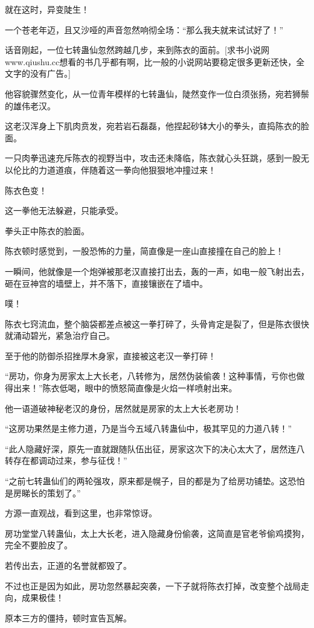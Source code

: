\begin{this_body}
就在这时，异变陡生！

一个苍老年迈，且又沙哑的声音忽然响彻全场：“那么我夫就来试试好了！”

话音刚起，一位七转蛊仙忽然跨越几步，来到陈衣的面前。[求书小说网www.qiushu.cc想看的书几乎都有啊，比一般的小说网站要稳定很多更新还快，全文字的没有广告。]

他容貌骤然变化，从一位青年模样的七转蛊仙，陡然变作一位白须张扬，宛若狮鬃的雄伟老汉。

这老汉浑身上下肌肉贲发，宛若岩石磊磊，他捏起砂钵大小的拳头，直捣陈衣的脸面。

一只肉拳迅速充斥陈衣的视野当中，攻击还未降临，陈衣就心头狂跳，感到一股无以伦比的力道道痕，伴随着这一拳向他狠狠地冲撞过来！

陈衣色变！

这一拳他无法躲避，只能承受。

拳头正中陈衣的脸面。

陈衣顿时感觉到，一股恐怖的力量，简直像是一座山直接撞在自己的脸上！

一瞬间，他就像是一个炮弹被那老汉直接打出去，轰的一声，如电一般飞射出去，砸在豆神宫的墙壁上，并不落下，直接镶嵌在了墙中。

噗！

陈衣七窍流血，整个脑袋都差点被这一拳打碎了，头骨肯定是裂了，但是陈衣很快就涌动碧光，紧急治疗自己。

至于他的防御杀招挫厚木身家，直接被这老汉一拳打碎！

“房功，你身为房家太上大长老，八转修为，居然伪装偷袭！这种事情，亏你也做得出来！”陈衣低喝，眼中的愤怒简直像是火焰一样喷射出来。

他一语道破神秘老汉的身份，居然就是房家的太上大长老房功！

“这房功果然是主修力道，乃是当今五域八转蛊仙中，极其罕见的力道八转！”

“此人隐藏好深，原先一直就跟随队伍出征，房家这次下的决心太大了，居然连八转存在都调动过来，参与征伐！”

“之前七转蛊仙们的两轮强攻，原来都是幌子，目的都是为了给房功铺垫。这恐怕是房睇长的策划了。”

方源一直观战，看到这里，也非常惊讶。

房功堂堂八转蛊仙，太上大长老，进入隐藏身份偷袭，这简直是官老爷偷鸡摸狗，完全不要脸皮了。

若传出去，正道的名誉就都毁了。

不过也正是因为如此，房功忽然暴起突袭，一下子就将陈衣打掉，改变整个战局走向，成果极佳！

原本三方的僵持，顿时宣告瓦解。


\end{this_body}
